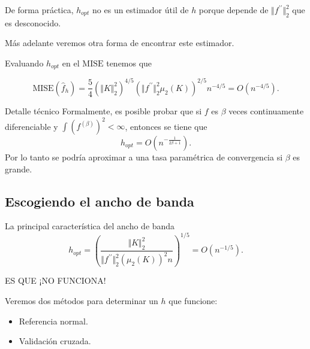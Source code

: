 \documentclass[12pt]{book}\usepackage[]{graphicx}\usepackage[]{color}
\theoremstyle{definition}
\theoremstyle{plain}
\begin{document}
\begin{nota}{}{}
	De forma práctica, $h_{opt}$ no es un estimador útil de $h$ porque depende de $\Vert f^{\prime\prime}\Vert_{2}^{2}$  que es desconocido.

	Más adelante veremos otra forma de encontrar este estimador.
\end{nota}

Evaluando $h_{opt}$ en el \(\mathrm{MISE}\) tenemos que

\begin{equation*}
	\mathrm{MISE}(\hat{f}_{h})=\frac{5}{4}\left(\Vert K\Vert_{2}^{2}\right)^{4/5}\left(\Vert f^{\prime\prime}\Vert_{2}^{2}\mu_{2}(K)\right)^{2/5}n^{-4/5} = O\left( n^{-4/5} \right).
\end{equation*}



\newpage

\begin{nota}{Detalle técnico}{}
	Formalmente, es posible probar que si $f$ es $\beta$ veces continuamente diferenciable y  $\int\left(f^{(\beta)}\right)^{2}<\infty$, entonces se tiene que
	\[
		{\displaystyle h_{opt}=O\left(n^{-\frac{1}{2\beta+1}}\right).}
	\]
	Por lo tanto se podría aproximar a una tasa paramétrica de convergencia si
	\(\beta\) es grande.
\end{nota}

\newpage

\subsection{Escogiendo el ancho de banda}

\begin{nota}{}{}
	La principal característica del ancho de banda
	\begin{equation*}
		h_{opt}=\left(\frac{\Vert K\Vert_{2}^{2}}{\Vert f^{\prime\prime}\Vert_{2}^{2}\left(\mu_{2}(K)\right)^{2}n}\right)^{1/5}=O\left( n^{-1/5} \right).
	\end{equation*}

	ES QUE ¡NO FUNCIONA!

\end{nota}

Veremos dos métodos para determinar un \(h\) que funcione:

\begin{itemize}
	\item Referencia normal.
	\item Validación cruzada.
\end{itemize}
\end{document}
